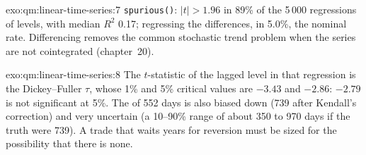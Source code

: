 \begin{solution}{exo:qm:linear-time-series:7}
\texttt{spurious()}: $|t| > 1.96$ in 89\% of the 5\,000 regressions of levels, with median $R^2$ 0.17; regressing the differences, in 5.0\%, the nominal
rate. Differencing removes the common stochastic trend problem when the series are not cointegrated (chapter~20).
\end{solution}

\begin{solution}{exo:qm:linear-time-series:8}
The $t$-statistic of the lagged level in that regression is the Dickey--Fuller $\tau$, whose 1\% and 5\% critical values are $-3.43$ and $-2.86$: $-2.79$
is not significant at 5\%. The  of 552 days is also biased down (739 after Kendall's correction) and very uncertain (a 10--90\% range of about
350 to 970 days if the truth were 739). A trade that waits years for reversion must be sized for the possibility that there is none.
\end{solution}

